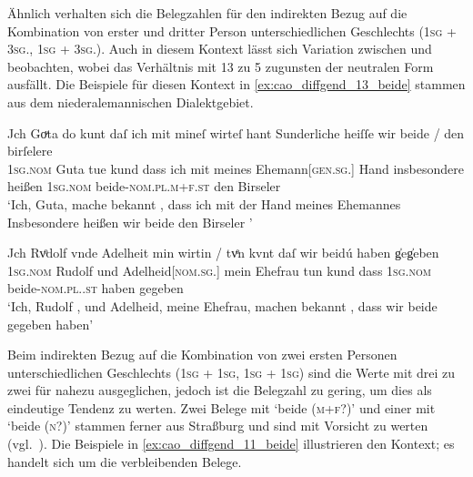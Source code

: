 Ähnlich verhalten sich die Belegzahlen für den indirekten Bezug auf die
Kombination von erster und dritter Person unterschiedlichen Geschlechts
(\textsc{1sg\subM{} + 3sg.\FemF}, \textsc{1sg\subF{} + 3sg.\MascM}). Auch in
diesem Kontext lässt sich Variation zwischen  und 
beobachten, wobei das Verhältnis mit 13 zu 5 zugunsten der neutralen Form
ausfällt. Die Beispiele für diesen Kontext in \cref{ex:cao_diffgend_13_beide}
stammen aus
dem niederalemannischen Dialektgebiet.

\begin{exe}
\ex \label{ex:cao_diffgend_13_beide}
	\begin{xlist}
	\ex \label{ex:cao_diffgend_13_beide_1}
		\gll Jch Goͮta \textelp{} do kunt \textelp{} daſ ich mit mineſ
			wirteſ hant \textelp{} Sunderliche heiſſe wir
			beide / den birſelere~\scalebox{.9}{\textelp{}} \\
			\textsc{1sg\subF.nom} Guta {} tue kund {} dass ich mit meines
			Ehemann[\textsc{gen.sg.\MascM}] Hand {} insbesondere heißen
			\textsc{1sg\subMF.nom} beide-\textsc{nom.pl.m+f\subMF.st} {} den
			Birseler~{} \\
		\trans `Ich, Guta, \textelp{} mache bekannt \textelp{}, dass ich
			mit der Hand meines Ehemannes \textelp{} Insbesondere heißen wir
			beide den Birseler \textelp{}'
				\parencites(Nr.~199, Basel, 1273)[210,21--28]{cao1}

	\ex \label{ex:cao_diffgend_13_beide_2}
		\gll Jch Rvͦdolf \textelp{} vnde Adelheit min wirtin / tvͤn
			kvnt \textelp{} daſ wir beidú \textelp{} haben
			g̍eg̍eben \textelp{} \\
			\textsc{1sg\subM.nom} Rudolf {} und Adelheid[\textsc{nom.sg.\FemF}] mein
			Ehefrau {} tun kund {} dass \textsc{1sg\subMF.nom}
			beide-\textsc{nom.pl.\NeutMF.st} {} haben gegeben {}\\
		\trans `Ich, Rudolf \textelp{}, und Adelheid, meine Ehefrau,
			machen bekannt \textelp{}, dass wir beide \textelp{} gegeben haben'
			\parencites(Nr.~1154, Guebwiller, Dépt.~Haut-Rhin, 1289)[432,5--11]{cao2}
	\end{xlist}
\end{exe}

Beim indirekten Bezug auf die Kombination von zwei ersten Personen
unterschiedlichen Geschlechts (\textsc{1sg\subM{} + 1sg\subF},
\textsc{1sg\subF{} + 1sg\subM}) sind die Werte mit drei zu zwei für
 nahezu ausgeglichen, jedoch ist die Belegzahl zu gering, um dies
als eindeutige Tendenz zu werten. Zwei Belege mit  `beide (\textsc{m+f}?)'
und einer mit  `beide (\textsc{n}?)' stammen ferner aus Straßburg und sind
mit Vorsicht zu werten (vgl.~). Die Beispiele in
\cref{ex:cao_diffgend_11_beide}
illustrieren den Kontext; es handelt sich um die verbleibenden Belege.


